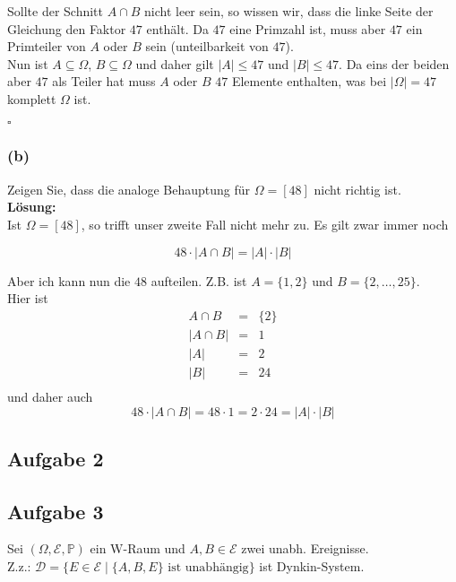 \documentclass[11pt,a4paper,ngerman]{article}
\newcommand{\set}[1]{ \{ #1 \}}
\newcommand{\Prob}{\mathbb{P}}
\newcommand{\Epsilon}{\mathcal{E}}
\begin{document}
Sollte der Schnitt $A \cap B$ nicht leer sein, so wissen wir, dass die linke Seite der Gleichung den Faktor $47$ enthält. Da $47$ eine Primzahl ist, muss
aber $47$ ein Primteiler von $A$ oder $B$ sein (unteilbarkeit von $47$).\\

Nun ist $A \subseteq \Omega$, $B \subseteq \Omega$ und daher gilt $|A| \leq 47$ und $|B| \leq 47$. Da eins der beiden aber $47$ als Teiler hat muss $A$ oder $B$
$47$ Elemente enthalten, was bei $|\Omega| = 47$ komplett $\Omega$ ist.

\mbox{}\hfill$\square$

\subsubsection*{(b)}

Zeigen Sie, dass die analoge Behauptung für $\Omega = [48]$ nicht richtig ist.\\

\textbf{Lösung:}\\

Ist $\Omega = \left[ 48 \right]$, so trifft unser zweite Fall nicht mehr zu. Es gilt zwar immer noch

\[
    48 \cdot \left| A \cap B \right| = |A| \cdot |B|
\]

Aber ich kann nun die $48$ aufteilen. Z.B. ist $A = \{1,2\}$ und $B = \{2,\dots,25\}$.\\

Hier ist
\[
    \begin{array}{rcl}
        A \cap B    &=& \{2\}\\
        |A \cap B| &=& 1\\
        |A|     &=& 2\\
        |B|     &=& 24\\
    \end{array}
\]
und daher auch
\[
    48 \cdot \left| A \cap B \right| = 48 \cdot 1 = 2 \cdot 24 = |A| \cdot |B|
\]

\subsection*{Aufgabe 2}
\subsection*{Aufgabe 3}
\newcommand{\D}{\mathcal{D}}
Sei $(\Omega, \Epsilon, \Prob)$ ein W-Raum und $A,B \in \Epsilon$ zwei unabh. Ereignisse. \\
Z.z.: $\mathcal{D} = \set{E \in \Epsilon \; | \; \set{A,B, E} \text{ ist unabhängig}}$ ist Dynkin-System. \\
\end{document}
